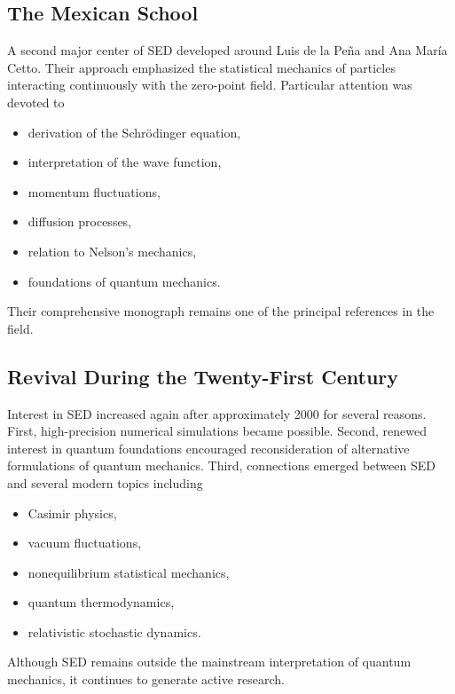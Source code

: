 \subsection{The Mexican School}
A second major center of SED developed around Luis de la Peña and Ana
María Cetto.
Their approach emphasized the statistical mechanics of particles
interacting continuously with the zero-point field.
Particular attention was devoted to
\begin{itemize}
\item derivation of the Schrödinger equation,
\item interpretation of the wave function,
\item momentum fluctuations,
\item diffusion processes,
\item relation to Nelson's mechanics,
\item foundations of quantum mechanics.
\end{itemize}
Their comprehensive monograph remains one of the principal references in
the field.
\subsection{Revival During the Twenty-First Century}
Interest in SED increased again after approximately 2000 for several
reasons.
First,
high-precision numerical simulations became possible.
Second,
renewed interest in quantum foundations encouraged reconsideration of
alternative formulations of quantum mechanics.
Third,
connections emerged between SED and several modern topics including
\begin{itemize}
\item Casimir physics,
\item vacuum fluctuations,
\item nonequilibrium statistical mechanics,
\item quantum thermodynamics,
\item relativistic stochastic dynamics.
\end{itemize}
Although SED remains outside the mainstream interpretation of quantum
mechanics, it continues to generate active research.
